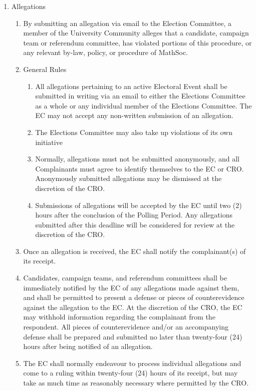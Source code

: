 \begin{enumerate}
    \item Allegations
    \begin{enumerate}
        \item By submitting an allegation via email to the Election Committee, a member of the University Community alleges that a candidate, campaign team or referendum committee, has violated portions of this procedure, or any relevant by-law, policy, or procedure of MathSoc.
        \item General Rules 
        \begin{enumerate}
            \item All allegations pertaining to an active Electoral Event shall be submitted in writing via an email to either the Elections Committee as a whole or any individual member of the Elections Committee. The EC may not accept any non-written submission of an allegation.
            \item The Elections Committee may also take up violations of its own initiative
            \item Normally, allegations must not be submitted anonymously, and all Complainants must agree to identify themselves to the EC or CRO. Anonymously submitted allegations may be dismissed at the discretion of the CRO.
            \item Submissions of allegations will be accepted by the EC until two (2) hours after the conclusion of the Polling Period. Any allegations submitted after this deadline will be considered for review at the discretion of the CRO.
        \end{enumerate}
        \item Once an allegation is received, the EC shall notify the complainant(s) of its receipt.
        \item Candidates, campaign teams, and referendum committees shall be immediately notified by the EC of any allegations made against them, and shall be permitted to present a defense or pieces of counterevidence against the allegation to the EC. At the discretion of the CRO, the EC may withhold information regarding the complainant from the respondent. All pieces of counterevidence and/or an accompanying defense shall be prepared and submitted no later than twenty-four (24) hours after being notified of an allegation.
        \item The EC shall normally endeavour to process individual allegations and come to a ruling within twenty-four (24) hours of its receipt, but may take as much time as reasonably necessary where permitted by the CRO.

\end{enumerate}
\end{enumerate}
